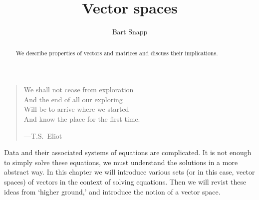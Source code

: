 \documentclass{ximera}
\author{Bart Snapp}
\title{Vector spaces}
\begin{document}
\begin{abstract}
  We describe properties of vectors and matrices and discuss their
  implications.
\end{abstract}
\maketitle

\begin{quote}
  We shall not cease from exploration\\
  And the end of all our exploring\\
  Will be to arrive where we started\\
  And know the place for the first time.


  \hfill ---T.S.\ Eliot
\end{quote}


Data and their associated systems of equations are complicated. It is
not enough to simply solve these equations, we must understand the
solutions in a more abstract way. In this chapter we will introduce
various sets (or in this case, vector spaces) of vectors in the
context of solving equations. Then we will revist these ideas from
`higher ground,' and introduce the notion of a vector space.
\end{document}
